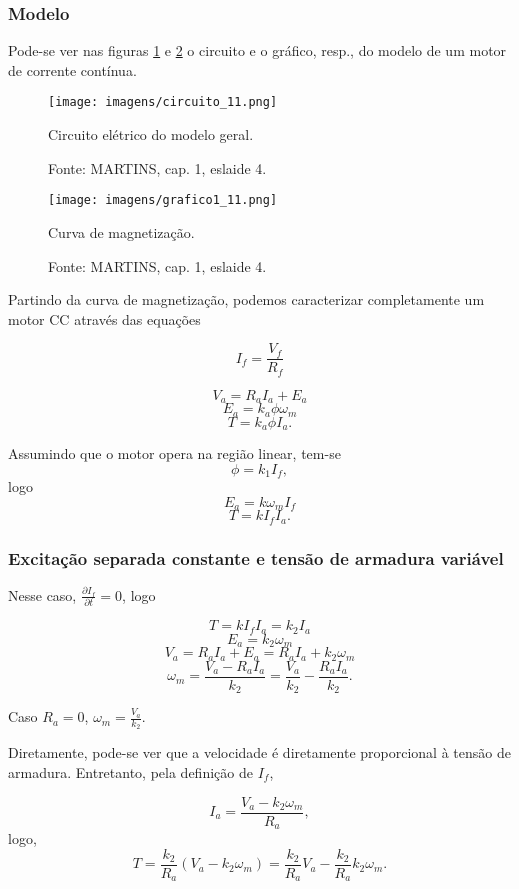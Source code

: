 \subsubsection{Modelo}

Pode-se ver nas figuras \ref{fig:C11} e \ref{fig:G1_11} o circuito e o gráfico, resp., do modelo de um motor de corrente contínua.

\begin{figure}[ht!]
\center
\texttt{[image: imagens/circuito\_11.png]}
\caption{\label{fig:C11}Circuito elétrico do modelo geral.}
\caption*{Fonte: MARTINS, cap. 1, eslaide 4.}
\end{figure}

\begin{figure}[ht!]
\center
\texttt{[image: imagens/grafico1\_11.png]}
\caption{\label{fig:G1_11}Curva de magnetização.}
\caption*{Fonte: MARTINS, cap. 1,  eslaide 4.}
\end{figure}

Partindo da curva de magnetização, podemos caracterizar completamente um motor CC através das equações

\[I_{f} = \frac{V_{f}}{R_{f}}\]

\[V_{a} = R_{a}I_{a} + E_{a}\]
\[E_{a} = k_{a}\phi{\omega_{m}}\]
\[T = k_{a}\phi I_{a}.\]

Assumindo que o motor opera na região linear, tem-se
\[\phi = k_{1}I_{f},\]
logo
\[E_{a} = k\omega_{m}I_{f}\]
\[T = kI_{f}I_{a}.\]

\subsubsection{Excitação separada constante e tensão de armadura variável}

Nesse caso, $\frac{\partial I_f}{\partial t} = 0$, logo

\[T = kI_{f}I_{a} = k_{2}I_{a}\]
\[E_{a} = k_{2}\omega_{m}\]
\[V_{a} = R_{a}I_{a} + E_{a} = R_{a}I_{a} + k_{2}\omega_{m}\]
\[\omega_{m} = \frac{V_{a} - R_{a}I_{a}}{k_{2}} = \frac{V_{a}}{k_{2}} - \frac{ R_{a}I_{a}}{k_{2}}.\]

Caso $R_{a} = 0$, $\omega_{m} = \frac{V_{a}}{k_{2}}$.

Diretamente, pode-se ver que a velocidade é diretamente proporcional à tensão de armadura. Entretanto, pela definição de $I_{f}$,

\[I_{a} = \frac{V_{a} - k_{2}\omega_{m}}{R_{a}},\]
logo,
\[T = \frac{k_{2}}{R_{a}}(V_{a} - k_{2}\omega_{m}) = \frac{k_{2}}{R_{a}}V_{a} - \frac{k_{2}}{R_{a}}k_{2}\omega_{m}.\]

